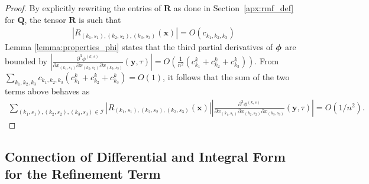 \documentclass[acmsmall]{acmart}
\newcommand\bx{\mathbf{x}}
\newcommand\by{\mathbf{y}}
\newcommand\bR{\mathbf{R}}
\newcommand\bphi{\text{\boldmath$\phi$}}
\newcommand\bQ{\mathbf{Q}}
\newcommand\calI{\mathcal{I}}
\newcommand\abs[1]{\left|#1\right|}         %
\begin{document}
\begin{proof}
By explicitly rewriting the entries of $\bR$ as done in Section~\ref{apx:rmf_def} for $\bQ$, the tensor $\mathbf{R}$ is such that
\begin{align*}
  \abs{R_{(k_1,s_1),(k_2,s_2),(k_3,s_3)}(\bx)} = O(c_{k_1,k_2,k_3})  
\end{align*}
Lemma \ref{lemma:properties_phi} states that the third partial derivatives of $\bphi$ are bounded by $\abs{\frac{\partial^3 \phi^{(k,s)}}{\partial x_{(k_1,s_1)} \partial x_{(k_2,s_2)} \partial x_{(k_3,s_3)}}(\by, \tau)} = O(\frac{1}{n^2}(c^k_{k_1}+ c^k_{k_2}+c^k_{k_3}))$. From $\sum_{k_1,k_2,k_3}c_{k_1,k_2,k_3}(c^k_{k_1}+ c^k_{k_2}+c^k_{k_3}) = O(1)$, it follows that the sum of the two terms above behaves as \color{black}
\begin{align*}
\sum_{(k_1, s_1),(k_2, s_2),(k_3, s_3) \in \calI } \abs{R_{(k_1,s_1),(k_2,s_2),(k_3,s_3)}(\bx)}\abs{\frac{\partial^3 \phi^{(k,s)}}{\partial x_{(k_1,s_1)} \partial x_{(k_2,s_2)} \partial x_{(k_3,s_3)}}(\by, \tau)} = O(1/n^2).
\end{align*}
\end{proof}


\subsection{Connection of Differential and Integral Form for the Refinement Term}
\end{document}
